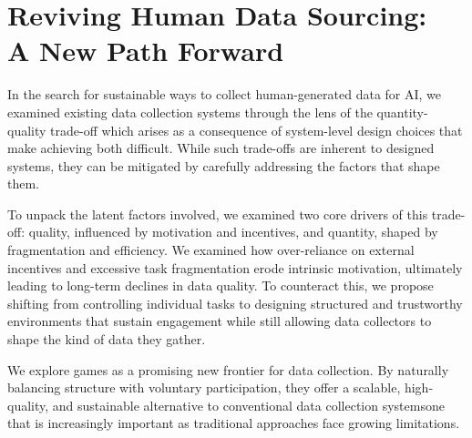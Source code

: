 \section{Reviving Human Data Sourcing: \\A New Path Forward}
In the search for sustainable ways to collect human-generated data for AI, we examined existing data collection systems through the lens of the quantity-quality trade-off which arises as a consequence of system-level design choices that make achieving both difficult. While such trade-offs are inherent to designed systems, they can be mitigated by carefully addressing the factors that shape them.

To unpack the latent factors involved, we examined two core drivers of this trade-off: quality, influenced by motivation and incentives, and quantity, shaped by fragmentation and efficiency. We examined how over-reliance on external incentives and excessive task fragmentation erode intrinsic motivation, ultimately leading to long-term declines in data quality. To counteract this, we propose shifting from controlling individual tasks to designing structured and trustworthy environments that sustain engagement while still allowing data collectors to shape the kind of data they gather.

We explore games as a promising new frontier for data collection. By naturally balancing structure with voluntary participation, they offer a scalable, high-quality, and sustainable alternative to conventional data collection systems\textemdash{}one that is increasingly important as traditional approaches face growing limitations.



